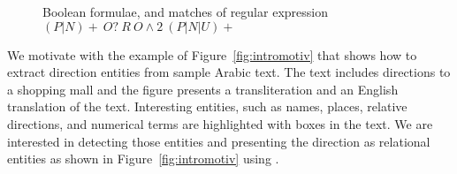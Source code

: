 \setarab
\transfalse
\begin{figure*}[tb!]
\renewcommand{\arraystretch}{1.5}%
  \caption{\framework Boolean formulae, and matches of regular expression $(P|N)+~O?~R~O\wedge 2~(P|N|U)+$}
  \label{fig:motiv}
\end{figure*}
\transtrue
{}

We motivate \framework with the example of Figure~\ref{fig:intromotiv} 
that shows how to extract direction entities from sample Arabic text. 
The text includes directions to a shopping mall and the 
figure presents a transliteration and an English translation of the text.
Interesting entities, such as names, places, relative directions, 
and numerical terms are highlighted with boxes in the text. 
We are interested in detecting those entities and presenting 
the direction as relational entities as 
shown in Figure~\ref{fig:intromotiv} using \framework.


